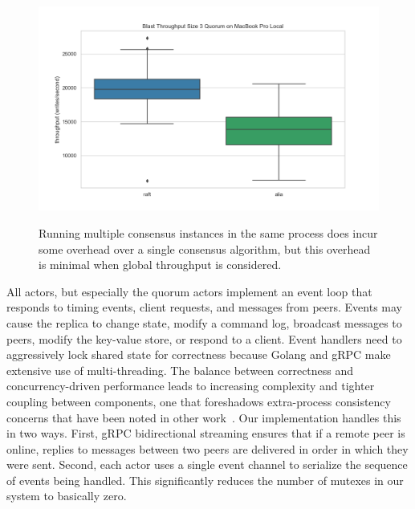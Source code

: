 \begin{figure}
    \begin{center}
        \includegraphics[width=5in]{figures/ch05_alia_raft_overhead.png}
    \end{center}
    \renewcommand{\baselinestretch}{1}
    \small\normalsize

    \begin{quote}
        \caption[Overhead of Root Consensus]{Running multiple consensus instances in the same process does incur some overhead over a single consensus algorithm, but this overhead is minimal when global throughput is considered.}
        \label{fig:ch05_alia_raft_overhead}
    \end{quote}
\end{figure}
\renewcommand{\baselinestretch}{2}
\small\normalsize

All actors, but especially the quorum actors implement an event loop that responds to timing events, client requests, and messages from peers.
Events may cause the replica to change state, modify a command log, broadcast
messages to peers, modify the key-value store, or respond to a client.
Event handlers need to aggressively lock shared state for correctness because Golang and gRPC make extensive use of multi-threading.
The balance between correctness and concurrency-driven performance leads to
increasing complexity and tighter coupling between components, one that
foreshadows extra-process consistency concerns that have been noted in other
work~\cite{paxos_live,raft,raft_students_guide}.
Our implementation handles this in two ways.
First, gRPC bidirectional streaming ensures that if a remote peer is online, replies to messages between two peers are delivered in order in which they were sent.
Second, each actor uses a single event channel to serialize the sequence of events being handled.
This significantly reduces the number of mutexes in our system to basically zero.

